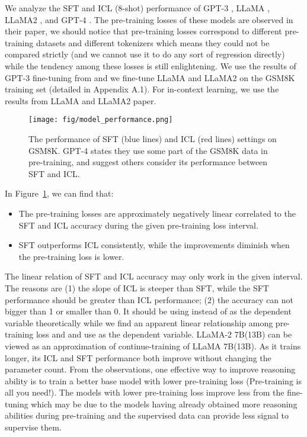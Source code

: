\documentclass{article} \usepackage{iclr2021_conference,times}
\begin{document}
We analyze the SFT and ICL (8-shot) performance of GPT-3 \citep{gpt3}, LLaMA \citep{llama}, LLaMA2 \citep{llama2}, and GPT-4 \citep{gpt4}. 
The pre-training losses of these models are observed in their paper, we should notice that pre-training losses correspond to different pre-training datasets and different tokenizers which means they could not be compared strictly (and we cannot use it to do any sort of regression directly) while the tendency among these losses is still enlightening.
We use the results of GPT-3 fine-tuning from \citep{gsm8k} and we fine-tune LLaMA and LLaMA2 on the GSM8K training set (detailed in Appendix A.1).
For in-context learning, we use the results from LLaMA \citep{llama} and LLaMA2 \citep{llama2} paper.

\begin{figure}[t]
    \centering
    \texttt{[image: fig/model\_performance.png]}
    \caption{The performance of SFT (blue lines) and ICL (red lines) settings on GSM8K. GPT-4 states they use some part of the GSM8K data in pre-training, and suggest others consider its performance between SFT and ICL.}
    \label{fig:sft_full}
\end{figure}
In Figure~\ref{fig:sft_full}, we can find that:
\begin{itemize}
    \item The pre-training losses are approximately negatively linear correlated to the SFT and ICL accuracy during the given pre-training loss interval. 
    \item SFT outperforms ICL consistently, while the improvements diminish when the pre-training loss is lower.
\end{itemize}
The linear relation of SFT and ICL accuracy may only work in the given interval. The reasons are (1) the slope of ICL is steeper than SFT, while the SFT performance should be greater than ICL performance; (2) the accuracy can not bigger than 1 or smaller than 0. It should be using  instead of  as the dependent variable theoretically while we find an apparent linear relationship among pre-training loss and  and use  as the dependent variable.
LLaMA-2 7B(13B) can be viewed as an approximation of continue-training of LLaMA 7B(13B). As it trains longer, its ICL and SFT performance both improve without changing the parameter count.
From the observations, one effective way to improve reasoning ability is to train a better base model with lower pre-training loss (Pre-training is all you need!).
The models with lower pre-training loss improve less from the fine-tuning which may be due to the models having already obtained more reasoning abilities during pre-training and the supervised data can provide less signal to supervise them.
\end{document}
